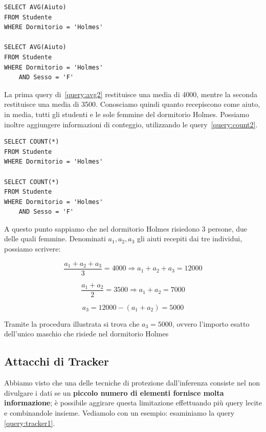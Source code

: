 \begin{algorithm}
\begin{lstlisting}[caption={Query di Media per ottenere informazioni sugli studenti del dormitorio Holmes \label{query:avg2}}] 
SELECT AVG(Aiuto)
FROM Studente
WHERE Dormitorio = 'Holmes'

SELECT AVG(Aiuto)
FROM Studente
WHERE Dormitorio = 'Holmes'
	AND Sesso = 'F'
\end{lstlisting}
\end{algorithm}

La prima query di~\ref{query:avg2} restituisce una media di 4000, mentre la seconda restituisce una media di 3500. Conosciamo quindi quanto recepiscono come aiuto, in media, tutti gli studenti e le sole femmine del dormitorio Holmes. Possiamo inoltre aggiungere informazioni di conteggio, utilizzando le query~\ref{query:count2}.

\begin{algorithm}
\begin{lstlisting}[caption={Query di conteggio per ottenere informazioni sugli studenti del dormitorio Holmes \label{query:count2}}]
SELECT COUNT(*)
FROM Studente
WHERE Dormitorio = 'Holmes'

SELECT COUNT(*)
FROM Studente
WHERE Dormitorio = 'Holmes'
	AND Sesso = 'F'
\end{lstlisting}
\end{algorithm}

A questo punto sappiamo che nel dormitorio Holmes risiedono 3 persone, due delle quali femmine. Denominati $a_1,a_2,a_3$ gli aiuti recepiti dai tre individui, possiamo scrivere:

\begin{equation}
\frac{a_1 + a_2 + a_3}{3} = 4000 \Rightarrow a_1 + a_2 + a_3 = 12000
\end{equation}

\begin{equation}
\frac{a_1 + a_2}{2} = 3500 \Rightarrow a_1 + a_2 = 7000
\end{equation}

\begin{equation}
 a_3 = 12000 - (a_1 + a_2) = 5000
\end{equation}

Tramite la procedura illustrata si trova che $ a_{3} = 5000 $, ovvero l'importo esatto dell'unico maschio che risiede nel dormitorio Holmes

\subsection{Attacchi di Tracker}
Abbiamo visto che una delle tecniche di protezione dall'inferenza consiste nel non divulgare i dati se un \textbf{piccolo numero di elementi fornisce molta informazione}; è possibile aggirare questa limitazione effettuando più query lecite e combinandole insieme. Vediamolo con un esempio: esaminiamo la query \ref{query:tracker1}.

